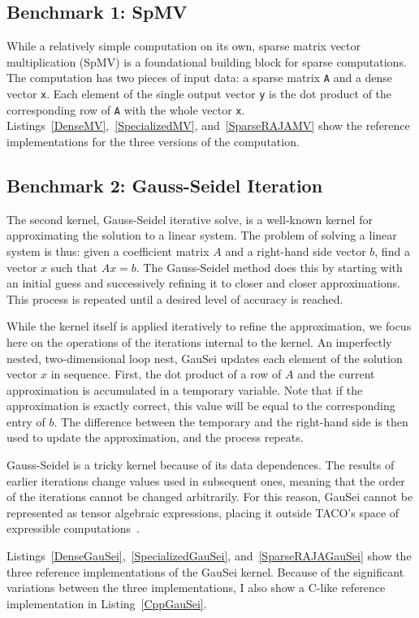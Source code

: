 \subsection{Benchmark 1: SpMV}
While a relatively simple computation on its own, sparse matrix vector multiplication (SpMV) is a foundational building block for sparse computations.
The computation has two pieces of input data: a sparse matrix \verb.A. and a dense vector \verb.x.. 
Each element of the single output vector \verb.y. is the dot product of the corresponding row of \verb.A. with the whole vector \verb.x..
Listings~\ref{DenseMV},~\ref{SpecializedMV}, and~\ref{SparseRAJAMV} show the reference implementations for the three versions of the computation.

\subsection{Benchmark 2: Gauss-Seidel Iteration}

The second kernel, Gauss-Seidel iterative solve, is a well-known kernel for approximating the solution to a linear system.
The problem of solving a linear system is thus: given a coefficient matrix $A$ and a right-hand side vector $b$, find a vector $x$ such that $Ax=b$.
The Gauss-Seidel method does this by starting with an initial guess and successively refining it to closer and closer approximations.
This process is repeated until a desired level of accuracy is reached.

While the kernel itself is applied iteratively to refine the approximation, we focus here on the operations of the iterations internal to the kernel.
An imperfectly nested, two-dimensional loop nest, GauSei updates each element of the solution vector $x$ in sequence.
First, the dot product of a row of $A$ and the current approximation is accumulated in a temporary variable.
Note that if the approximation is exactly correct, this value will be equal to the corresponding entry of $b$. 
The difference between the temporary and the right-hand side is then used to update the approximation, and the process repeats.

Gauss-Seidel is a tricky kernel because of its data dependences.
The results of earlier iterations change values used in subsequent ones, meaning that the order of the iterations cannot be changed arbitrarily. 
For this reason, GauSei cannot be represented as tensor algebraic expressions, placing it outside TACO's space of expressible computations~\cite{}.

Listings~\ref{DenseGauSei},~\ref{SpecializedGauSei}, and~\ref{SparseRAJAGauSei} show the three reference implementations of the GauSei kernel.
Because of the significant variations between the three implementations, I also show a C-like reference implementation in Listing~\ref{CppGauSei}.


